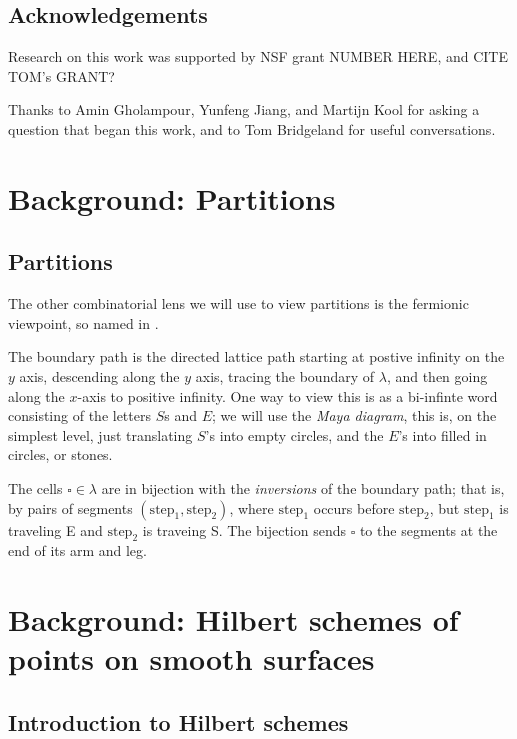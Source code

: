 \documentclass{amsart}[12pt]
\theoremstyle{definition}
\begin{document}
\subsection{Acknowledgements}

Research on this work was supported by NSF grant NUMBER HERE, and CITE TOM's GRANT?

Thanks to Amin Gholampour, Yunfeng Jiang, and Martijn Kool for asking a question that began this work, and to Tom Bridgeland for useful conversations.

\section{Background: Partitions}


\subsection{Partitions}


The other combinatorial lens we will use to view partitions is the fermionic viewpoint, so named in .  

The boundary path is the directed lattice path starting at postive infinity on the $y$ axis, descending along the $y$ axis, tracing the boundary of $\lambda$, and then going along the $x$-axis to positive infinity.  One way to view this is as a bi-infinte word consisting of the letters $S$s and $E$; we will use the \emph{Maya diagram}, this is, on the simplest level, just translating $S$'s into empty circles, and the $E$'s into filled in circles, or stones.  



The cells $\square\in\lambda$ are in bijection with the
\emph{inversions} of the boundary path; that is, by pairs of segments
$(\text{step}_1, \text{step}_2)$, where $\text{step}_1$ occurs before $\text{step}_2$, but $\text{step}_1$ is traveling E and $\text{step}_2$ is traveing S.  The bijection sends $\square$ to the segments at the end of its arm and leg.





\section{Background: Hilbert schemes of points on smooth surfaces}
\label{sec:smoothbackground}



\subsection{Introduction to Hilbert schemes}
\end{document}
